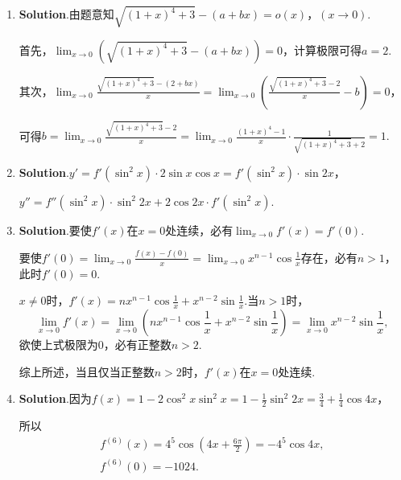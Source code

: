 \documentclass[../main.tex]{subfiles}
\begin{document}
\begin{enumerate}
          因此$f(x)=
              \begin{cases}
                  1,           & x>0, \\
                  \frac{1}{2}, & x=0, \\
                  x,           & x<0
              \end{cases}$，在区间$(-\infty,0)\cup(0,+\infty)$连续.

          因$f(0^{-})=0$，$f(0^{+})=1$，故$x=0$是$f(x)$的跳跃间断点.

    \item \textbf{Solution}.由题意知$\sqrt{(1+x)^{4}+3}-(a+bx)=o(x)$，$(x\to0)$.

          首先，$\lim_{x\to0}\left(\sqrt{(1+x)^{4}+3}-(a+bx)\right)=0$，计算极限可得$a
              =2$.

          其次，$\lim_{x\to0}\frac{\sqrt{(1+x)^4+3}-(2+bx)}{x}=\lim_{x\to0}\left(\frac{\sqrt{(1+x)^{4}+3}-2}{x}
              -b\right)=0$，

          可得$b=\lim_{x\to0}\frac{\sqrt{(1+x)^{4}+3}-2}{x}=\lim_{x\to0}\frac{(1+x)^{4}-1}{x}
              \cdot\frac{1}{\sqrt{(1+x)^{4}+3}+2}=1.$

    \item \textbf{Solution}.$y'=f'(\sin^{2} x)\cdot2\sin x\cos x=f'(\sin^{2} x)\cdot
              \sin 2x$，

          $y''=f''(\sin^{2} x)\cdot\sin^{2} 2x+2\cos 2x\cdot f'(\sin^{2} x)$.

    \item \textbf{Solution}.要使$f'(x)$在$x=0$处连续，必有$\lim_{x\to0}f'(x)=f'(0
              ).$

          要使$f'(0)=\lim_{x\to0}\frac{f(x)-f(0)}{x}=\lim_{x\to0}x^{n-1}\cos\frac{1}{x}$存在，必有$n
              >1$，此时$f'(0)=0$.

          $x\neq0$时，$f'(x)=nx^{n-1}\cos\frac{1}{x}+x^{n-2}\sin\frac{1}{x}$.当$n>1$时，
          \[
              \lim_{x\to0}f'(x)=\lim_{x\to0}\left(nx^{n-1}\cos\frac{1}{x}+x^{n-2}\sin\frac{1}{x}
              \right)=\lim_{x\to0}x^{n-2}\sin\frac{1}{x},
          \]
          欲使上式极限为0，必有正整数$n>2$.

          综上所述，当且仅当正整数$n>2$时，$f'(x)$在$x=0$处连续.

    \item \textbf{Solution}.因为$f(x)=1-2\cos^{2} x\sin^{2} x=1-\frac{1}{2}\sin^{2}
              2x=\frac{3}{4}+\frac{1}{4}\cos 4x$，

          所以
          \[
              \begin{gathered}
                  f^{(6)}(x)=4^5\cos\left(4x+\frac{6\pi}{2}\right)=-4^5\cos 4x,\\
                  f^{(6)}(0)=-1024.
              \end{gathered}
          \]
\end{enumerate}
\end{document}
